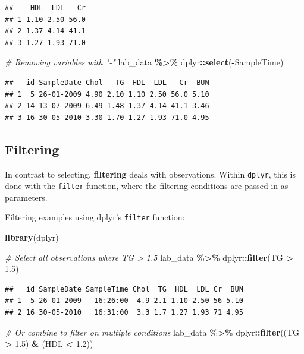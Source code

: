 \documentclass[
]{book}
\newenvironment{Shaded}{\begin{snugshade}}{\end{snugshade}}
\newcommand{\CommentTok}[1]{\textcolor[rgb]{0.56,0.35,0.01}{\textit{#1}}}
\newcommand{\FloatTok}[1]{\textcolor[rgb]{0.00,0.00,0.81}{#1}}
\newcommand{\FunctionTok}[1]{\textcolor[rgb]{0.13,0.29,0.53}{\textbf{#1}}}
\newcommand{\NormalTok}[1]{#1}
\newcommand{\SpecialCharTok}[1]{\textcolor[rgb]{0.81,0.36,0.00}{\textbf{#1}}}
\begin{document}
\begin{verbatim}
##    HDL  LDL   Cr
## 1 1.10 2.50 56.0
## 2 1.37 4.14 41.1
## 3 1.27 1.93 71.0
\end{verbatim}

\begin{Shaded}
\begin{Highlighting}[]
\CommentTok{\# Removing variables with "{-}"}
\NormalTok{lab\_data }\SpecialCharTok{\%\textgreater{}\%}\NormalTok{ dplyr}\SpecialCharTok{::}\FunctionTok{select}\NormalTok{(}\SpecialCharTok{{-}}\NormalTok{SampleTime)}
\end{Highlighting}
\end{Shaded}

\begin{verbatim}
##   id SampleDate Chol   TG  HDL  LDL   Cr  BUN
## 1  5 26-01-2009 4.90 2.10 1.10 2.50 56.0 5.10
## 2 14 13-07-2009 6.49 1.48 1.37 4.14 41.1 3.46
## 3 16 30-05-2010 3.30 1.70 1.27 1.93 71.0 4.95
\end{verbatim}

\subsection{Filtering}\label{sec:filtering}

In contrast to selecting, \textbf{filtering} deals with observations. Within \texttt{dplyr}, this is done with the \texttt{filter} function, where the filtering conditions are passed in as parameters.

Filtering examples using dplyr's \texttt{filter} function:

\begin{Shaded}
\begin{Highlighting}[]
\FunctionTok{library}\NormalTok{(dplyr)}

\CommentTok{\# Select all observations where TG \textgreater{} 1.5}
\NormalTok{lab\_data }\SpecialCharTok{\%\textgreater{}\%}\NormalTok{ dplyr}\SpecialCharTok{::}\FunctionTok{filter}\NormalTok{(TG }\SpecialCharTok{\textgreater{}} \FloatTok{1.5}\NormalTok{)}
\end{Highlighting}
\end{Shaded}

\begin{verbatim}
##   id SampleDate SampleTime Chol  TG  HDL  LDL Cr  BUN
## 1  5 26-01-2009   16:26:00  4.9 2.1 1.10 2.50 56 5.10
## 2 16 30-05-2010   16:31:00  3.3 1.7 1.27 1.93 71 4.95
\end{verbatim}

\begin{Shaded}
\begin{Highlighting}[]
\CommentTok{\# Or combine to filter on multiple conditions}
\NormalTok{lab\_data }\SpecialCharTok{\%\textgreater{}\%}\NormalTok{ dplyr}\SpecialCharTok{::}\FunctionTok{filter}\NormalTok{((TG }\SpecialCharTok{\textgreater{}} \FloatTok{1.5}\NormalTok{) }\SpecialCharTok{\&}\NormalTok{ (HDL }\SpecialCharTok{\textless{}} \FloatTok{1.2}\NormalTok{))}
\end{Highlighting}
\end{Shaded}
\end{document}
